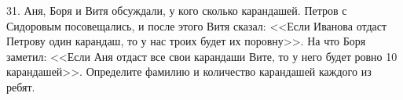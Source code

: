 31. Аня, Боря и Витя обсуждали, у кого сколько карандашей. Петров с Сидоровым посовещались, и после этого Витя сказал: <<Если Иванова отдаст Петрову один карандаш, то у нас троих будет их поровну>>. На что Боря заметил: <<Если Аня отдаст все свои карандаши Вите, то у него будет ровно 10 карандашей>>. Определите фамилию и количество карандашей каждого из ребят.\\
